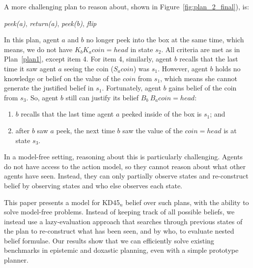 A more challenging  plan to reason about, shown in Figure~\ref{fig:plan_2_final}), is:
\begin{plan}
\label{plan2}
\emph{peek(a)}, \emph{return(a)}, \emph{peek(b)}, \emph{flip}
\end{plan}



In this plan, agent $a$ and $b$ no longer peek into the box at the same time, which means, we do not have $K_b K_a coin=head$ in state $s_2$.
All criteria are met as in Plan~\ref{plan1}, except item 4.
For item 4, similarly, agent $b$ recalls that the last time it saw agent $a$ seeing the coin ($S_a coin$) was $s_1$.
However, agent $b$ holds no knowledge or belief on the value of the $coin$ from $s_1$, which means she cannot generate the justified belief in $s_1$.
Fortunately, agent $b$ gains belief of the coin from $s_3$.
So, agent $b$ still can justify its belief $B_b\ B_a coin=head$:
\begin{enumerate}
    \item $b$ recalls that the last time agent $a$ peeked inside of the box is $s_1$; and
    \item after $b$ saw $a$ peek, the next time $b$ saw the value of the $coin=head$ is at state $s_3$.
\end{enumerate}

In a model-free setting, reasoning about this is particularly challenging. 
Agents do not have access to the action model, so they cannot reason about what other agents have seen. 
Instead, they can only partially observe states and re-construct belief by observing states and who else observes each state.

This paper presents a model for KD45$_n$ belief over such plans, with the ability to solve model-free problems. Instead of keeping track of all possible beliefs, we instead use a lazy-evaluation approach that searches through previous states of the plan to re-construct what has been seen, and by who, to evaluate nested belief formulae. Our results show that we can efficiently solve existing benchmarks in epistemic and doxastic planning, even with a simple prototype planner.





